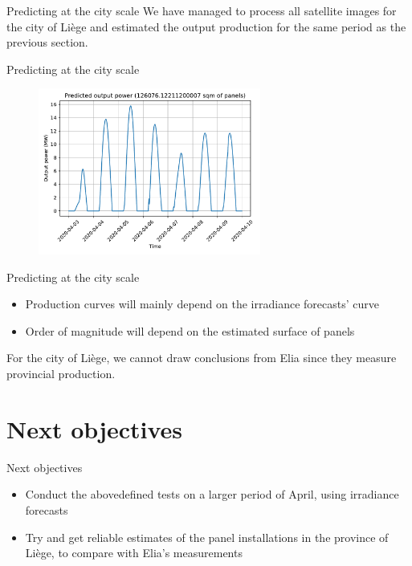 \documentclass[12pt]{beamer}
\begin{document}
\begin{frame}{Predicting at the city scale}
    We have managed to process all satellite images for the \alert{city} of Liège and estimated the output production for the \alert{same period} as the previous section. 
\end{frame}

\begin{frame}{Predicting at the city scale}
    \begin{figure}
    \centering
    \includegraphics[width=0.65\textwidth]{resources/pdf/solar_liege.pdf}
    \label{fig:solar_liege}
    \end{figure}
\end{frame}

\begin{frame}{Predicting at the city scale}
    \begin{itemize}
        \item Production \alert{curves} will mainly depend on the irradiance \alert{forecasts'} curve
        \item Order of \alert{magnitude} will depend on the estimated \alert{surface} of panels 
    \end{itemize}
    
    For the city of Liège, we cannot draw conclusions from Elia since they measure \alert{provincial} production.
\end{frame}

\section{Next objectives}
\begin{frame}{Next objectives}
    \begin{itemize}
        \item Conduct the abovedefined tests on a \alert{larger} period of April, using irradiance \alert{forecasts}
        \item Try and get \alert{reliable} estimates of the panel installations in the \alert{province} of Liège, to compare with Elia's measurements
    \end{itemize}
\end{frame}
\end{document}
